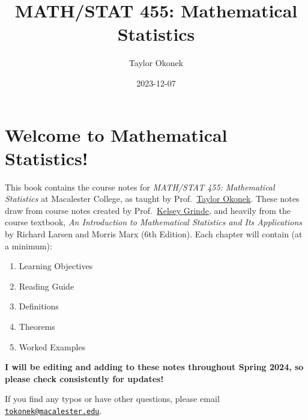 \documentclass[
  letterpaper,
  DIV=11,
  numbers=noendperiod]{scrreprt}
\title{MATH/STAT 455: Mathematical Statistics}
\author{Taylor Okonek}
\date{2023-12-07}
\renewcommand*\contentsname{Table of contents}
\newcommand\contentsname{Table of contents}
\begin{document}
\maketitle
\ifdefined\Shaded\renewenvironment{Shaded}{\begin{tcolorbox}[sharp corners, frame hidden, breakable, boxrule=0pt, interior hidden, borderline west={3pt}{0pt}{shadecolor}, enhanced]}{\end{tcolorbox}}\fi

\renewcommand*\contentsname{Table of contents}
{
\hypersetup{linkcolor=}
\setcounter{tocdepth}{2}
\tableofcontents
}

\hypertarget{welcome-to-mathematical-statistics}{%
\chapter*{Welcome to Mathematical
Statistics!}\label{welcome-to-mathematical-statistics}}


This book contains the course notes for \emph{MATH/STAT 455:}
\emph{Mathematical Statistics} at Macalester College, as taught by
Prof.~\href{https://taylorokonek.github.io/}{Taylor Okonek}. These notes
draw from course notes created by
Prof.~\href{https://kegrinde.github.io/}{Kelsey Grinde}, and heavily
from the course textbook, \emph{An Introduction to Mathematical
Statistics and Its Applications} by Richard Larsen and Morris Marx (6th
Edition). Each chapter will contain (at a minimum):

\begin{enumerate}
\def\labelenumi{\arabic{enumi}.}
\item
  Learning Objectives
\item
  Reading Guide
\item
  Definitions
\item
  Theorems
\item
  Worked Examples
\end{enumerate}

\textbf{I will be editing and adding to these notes throughout Spring
2024, so please check consistently for updates!}

If you find any typos or have other questions, please email
\href{mailto:tokonek@macalester.edu}{\nolinkurl{tokonek@macalester.edu}}.

\begin{verbatim}
\end{verbatim}
\end{document}
